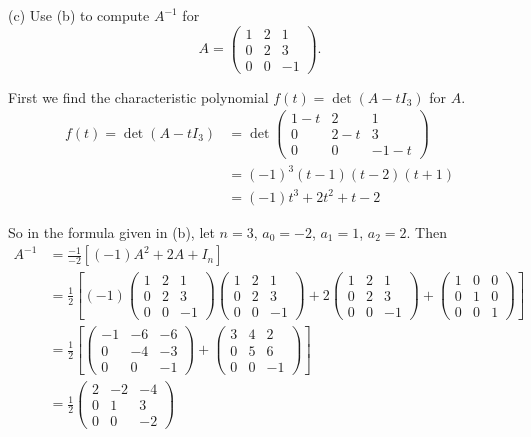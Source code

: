 \documentclass[11pt]{article}
\newcommand{\sbr}[1]{\left[#1\right]}
\begin{document}
(c) Use (b) to compute $A^{-1}$ for $$A = \begin{pmatrix}
  1 & 2 & 1 \\
  0 & 2 & 3 \\
  0 & 0 & -1
\end{pmatrix}.$$

First we find the characteristic polynomial $f(t) = \det(A-tI_3)$ for $A$. \begin{align*}
  f(t) = \det(A-tI_3) &= \det\begin{pmatrix}
  1-t & 2 & 1 \\
  0 & 2-t & 3 \\
  0 & 0 & -1-t
\end{pmatrix}\\
&= (-1)^3(t-1)(t-2)(t+1) \\
&= (-1)t^3+2t^2+t-2
\end{align*}

So in the formula given in (b), let $n=3$, $a_0=-2$, $a_1 = 1$, $a_2 = 2$. Then \begin{align*}
  A^{-1} &= \frac{-1}{-2}\sbr{(-1)A^{2}+2A +I_n} \\
  &= \frac{1}{2}\sbr{(-1)\begin{pmatrix}
    1 & 2 & 1 \\
    0 & 2 & 3 \\
    0 & 0 & -1
  \end{pmatrix}\begin{pmatrix}
    1 & 2 & 1 \\
    0 & 2 & 3 \\
    0 & 0 & -1
  \end{pmatrix} + 2\begin{pmatrix}
    1 & 2 & 1 \\
    0 & 2 & 3 \\
    0 & 0 & -1
  \end{pmatrix} + \begin{pmatrix}
    1 & 0 & 0 \\
    0 & 1 & 0 \\
    0 & 0 & 1
  \end{pmatrix}} \\
  &= \frac{1}{2}\sbr{\begin{pmatrix}
    -1 & -6 & -6 \\
    0 & -4 & -3 \\
    0 & 0 & -1
  \end{pmatrix} + \begin{pmatrix}
    3 & 4 & 2 \\
    0 & 5 & 6 \\
    0 & 0 & -1
  \end{pmatrix}} \\
  &= \boxed{\frac{1}{2}\begin{pmatrix}
    2 & -2 & -4 \\
    0 & 1 & 3 \\
    0 & 0 & -2
  \end{pmatrix}}
\end{align*}
\end{document}
